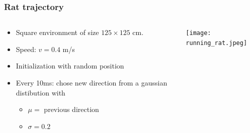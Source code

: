 \documentclass[mathserif]{beamer}
\begin{document}
\begin{frame}
\frametitle{Rat trajectory}
  \begin{columns}[T]
    \begin{column}{.5\textwidth}
			\begin{itemize}
		    \item Square environment of size $125 \times 125$ cm.
		    \item Speed: $v=0.4$ m/s
		    \item Initialization with random position
		    \item Every 10ms: chose new direction from a gaussian distibution with 
		    	\begin{itemize}
		    	\item $\mu=$ previous direction
		    	\item $\sigma= 0.2$
		    	\end{itemize}
		    \end{itemize}
    \end{column}
    \begin{column}{.5\textwidth}
    \texttt{[image: running\_rat.jpeg]}
    \end{column}
  \end{columns}
\end{frame}
\end{document}
